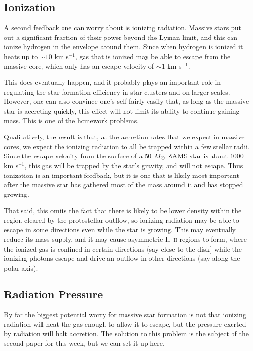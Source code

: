 \subsection{Ionization}

A second feedback one can worry about is ionizing radiation. Massive stars put out a significant fraction of their power beyond the Lyman limit, and this can ionize hydrogen in the envelope around them. Since when hydrogen is ionized it heats up to $\sim 10$ km s$^{-1}$, gas that is ionized may be able to escape from the massive core, which only has an escape velocity of $\sim 1$ km s$^{-1}$.

This does eventually happen, and it probably plays an important role in regulating the star formation efficiency in star clusters and on larger scales. However, one can also convince one's self fairly easily that, as long as the massive star is accreting quickly, this effect will not limit its ability to continue gaining mass. This is one of the homework problems.

Qualitatively, the result is that, at the accretion rates that we expect in massive cores, we expect the ionizing radiation to all be trapped within a few stellar radii. Since the escape velocity from the surface of a 50 $M_{\odot}$ ZAMS star is about $1000$ km s$^{-1}$, this gas will be trapped by the star's gravity, and will not escape. Thus ionization is an important feedback, but it is one that is likely most important after the massive star has gathered most of the mass around it and has stopped growing.

That said, this omits the fact that there is likely to be lower density within the region cleared by the protostellar outflow, so ionizing radiation may be able to escape in some directions even while the star is growing. This may eventually reduce its mass supply, and it may cause asymmetric H~\textsc{ii} regions to form, where the ionized gas is confined in certain directions (say close to the disk) while the ionizing photons escape and drive an outflow in other directions (say along the polar axis).

\subsection{Radiation Pressure}

By far the biggest potential worry for massive star formation is not that ionizing radiation will heat the gas enough to allow it to escape, but the pressure exerted by radiation will halt accretion. The solution to this problem is the subject of the second paper for this week, but we can set it up here.

